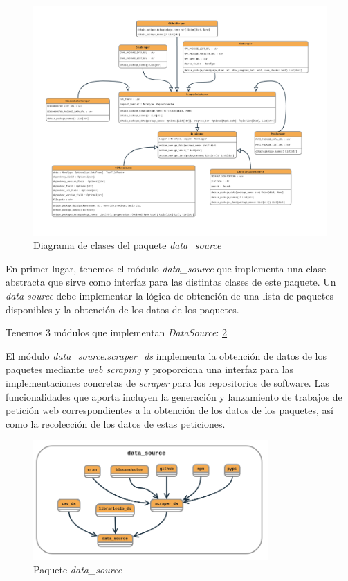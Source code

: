 \begin{figure}[ht!]
    \centering
    \includegraphics[width=1.2\textwidth]{img/anexos/data_source_classes.png}
    \caption{Diagrama de clases del paquete \textit{data\_source}}
    \label{fig:data_source_classes}
\end{figure}

En primer lugar, tenemos el módulo \textit{data\_source} que implementa una clase abstracta que
sirve como interfaz para las distintas clases de este paquete. Un \textit{data source} debe implementar
la lógica de obtención de una lista de paquetes disponibles y la obtención de los datos de los paquetes.

Tenemos 3 módulos que implementan \textit{DataSource}: \ref{fig:data_source}

El módulo \textit{data\_source}.\textit{scraper\_ds} implementa la obtención de datos de los paquetes
mediante \textit{web scraping} y proporciona una interfaz para las implementaciones concretas
de \textit{scraper} para los repositorios de software. Las funcionalidades que aporta incluyen
la generación y lanzamiento de trabajos de petición web correspondientes a la obtención de los datos
de los paquetes, así como la recolección de los datos de estas peticiones.

\begin{figure}[ht!]
    \centering
    \includegraphics[width=0.8\textwidth]{img/anexos/data_source.png}
    \caption{Paquete \textit{data\_source}}
    \label{fig:data_source}
\end{figure}

